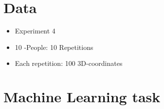 \documentclass[12pt,fleqn]{article}
\title{}
\author{Asger Schultz}
\date{\today}
\begin{document}
\maketitle

\section{Data}
\begin{itemize}
	\item Experiment 4
	\item 10 -People: 10 Repetitions
	\item Each repetition: 100 3D-coordinates
\end{itemize}

\section{Machine Learning task}
\end{document}
